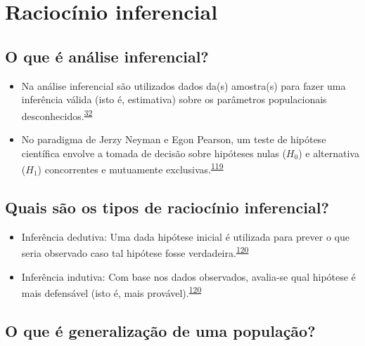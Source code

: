 \documentclass[
  a4paper,
]{book}
\begin{document}
\hypertarget{raciocinio-inferencial}{%
\section{Raciocínio inferencial}\label{raciocinio-inferencial}}

\hypertarget{o-que-uxe9-anuxe1lise-inferencial}{%
\subsection{O que é análise inferencial?}\label{o-que-uxe9-anuxe1lise-inferencial}}

\begin{itemize}
\item
  Na análise inferencial são utilizados dados da(s) amostra(s) para fazer uma inferência válida (isto é, estimativa) sobre os parâmetros populacionais desconhecidos.\textsuperscript{\protect\hyperlink{ref-vetter2017}{32}}
\item
  No paradigma de Jerzy Neyman e Egon Pearson, um teste de hipótese científica envolve a tomada de decisão sobre hipóteses nulas (\(H_{0}\)) e alternativa (\(H_{1}\)) concorrentes e mutuamente exclusivas.\textsuperscript{\protect\hyperlink{ref-Curran-Everett2009}{119}}
\end{itemize}

\hypertarget{quais-suxe3o-os-tipos-de-raciocuxednio-inferencial}{%
\subsection{Quais são os tipos de raciocínio inferencial?}\label{quais-suxe3o-os-tipos-de-raciocuxednio-inferencial}}

\begin{itemize}
\item
  Inferência dedutiva: Uma dada hipótese inicial é utilizada para prever o que seria observado caso tal hipótese fosse verdadeira.\textsuperscript{\protect\hyperlink{ref-goodman1999}{120}}
\item
  Inferência indutiva: Com base nos dados observados, avalia-se qual hipótese é mais defensável (isto é, mais provável).\textsuperscript{\protect\hyperlink{ref-goodman1999}{120}}
\end{itemize}

\hypertarget{o-que-uxe9-generalizauxe7uxe3o-de-uma-populauxe7uxe3o}{%
\subsection{O que é generalização de uma população?}\label{o-que-uxe9-generalizauxe7uxe3o-de-uma-populauxe7uxe3o}}
\end{document}
